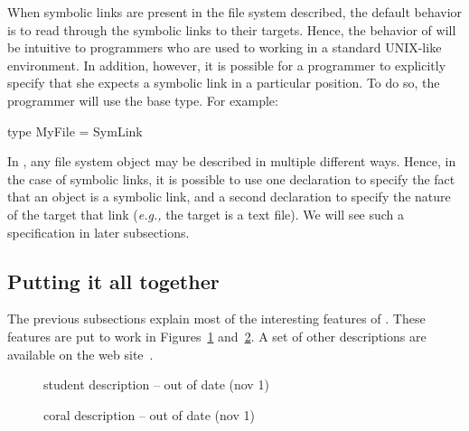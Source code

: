 When symbolic links are present in the file system described,
the default behavior is to read through the symbolic links to their
targets.  Hence, the behavior of \forest{} will be intuitive to programmers who
are used to working in a standard UNIX-like environment.  In addition, however, it is possible
for a programmer to explicitly specify that she expects a symbolic link in a particular
position.  To do so, the programmer will use the  base type.  For
example:
\begin{code}
type MyFile = SymLink
\end{code}
In \forest{}, any file system object may be described in multiple different ways.
Hence, in the case of symbolic links, it is possible to use one declaration to
specify the fact that an object is a symbolic link, and a second declaration to specify
the nature of the target that link ({\em e.g.,} the target is a text file).  We will see such 
a specification in later subsections.

\subsection{Putting it all together}

The previous subsections explain most of the interesting features of \forest{}.
These features are put to work in Figures~\ref{fig:student-description}
and~\ref{fig:coral-description}.  A set of other descriptions are available on 
the \forest{} web site~\cite{forest-web-site}.

\begin{figure}

\caption{\forest{} student description -- out of date (nov 1)}
\label{fig:student-description}
\end{figure}

\begin{figure}

\caption{\forest{} coral description -- out of date (nov 1)}
\label{fig:coral-description}
\end{figure}

